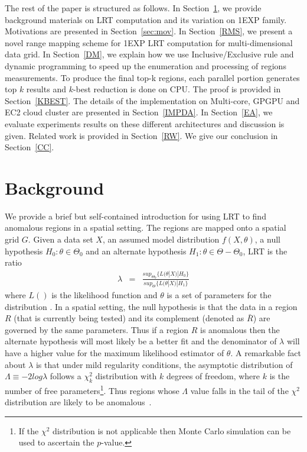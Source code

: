 \documentclass[AMA,LATO1COL]{WileyNJD-v2-bak}
\begin{document}
The rest of the paper is structured as follows. In Section~\ref{BG}, we provide
background materials on LRT computation and its variation on 1EXP family. Motivations are presented in Section~\ref{sec:mov}.  In Section~\ref{RMS}, we present a novel range mapping scheme for 1EXP LRT computation for multi-dimensional data grid. In Section~\ref{DM}, we explain how we use
Inclusive/Exclusive rule and dynamic programming to speed up the enumeration and
processing of regions measurements. To produce the final top-k regions, each parallel portion generates top $k$ results and $k$-best reduction is done on CPU. The proof is provided in Section~\ref{KBEST}. The details of the implementation on Multi-core, GPGPU and EC2 cloud cluster are presented in
Section~\ref{IMPDA}. In Section~\ref{EA}, we evaluate experiments results on these different architectures and discussion is given. Related
work is provided in Section~\ref{RW}. We give our conclusion in
Section~\ref{CC}.

\section{Background}\label{BG}

We provide a brief but self-contained introduction for using LRT
to find anomalous regions in a spatial setting. The regions are mapped onto a spatial grid $G$. Given a data set $X$, an assumed model distribution $f(X,\theta)$, a null hypothesis $H_{0}: \theta \in \Theta_0 $ and an alternate hypothesis $H_{1}: \theta \in {\Theta-\Theta_0}$, LRT is the ratio
\begin{eqnarray}\label{eq}
\lambda &=& \frac{ sup_{\Theta_0}\{L(\theta|X)|H_{0}\}}
{sup_{\Theta}\{L(\theta|X)|H_{1}\}}
\end{eqnarray}
where $L()$ is the likelihood function and  $\theta$ is a set of parameters
for the distribution \cite{jour}. In a spatial setting, the null hypothesis is that the data in a region $R$ (that is currently being tested) and
its complement (denoted as $\bar R$) are governed by the same
parameters. Thus if a region $R$ is anomalous then the alternate hypothesis will most likely be a better fit and the denominator of $\lambda$ will have a higher value for the maximum likelihood estimator of $\theta$.  A remarkable fact about $\lambda$ is that under mild regularity conditions, the asymptotic distribution of $\Lambda \equiv -2log\lambda$ follows a $ \chi ^{2}_{k}$ distribution with $k$ degrees of freedom, where
$k$ is the number of free parameters\footnote{If the $\chi^{2}$ distribution is not applicable then Monte Carlo simulation can be used to ascertain the $p$-value.}. Thus regions whose $\Lambda$ value falls in the tail of the $\chi^{2}$ distribution are likely to be anomalous~\cite{jour}.
\end{document}
